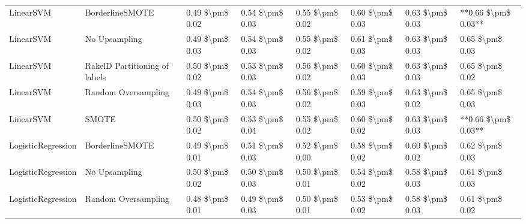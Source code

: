 \begin{tabular}{llllllll}
                      LinearSVM &               BorderlineSMOTE & 0.49 \$\textbackslash pm\$ 0.02 &           0.54 \$\textbackslash pm\$ 0.03 &       0.55 \$\textbackslash pm\$ 0.02 &        0.60 \$\textbackslash pm\$ 0.03 &                         0.63 \$\textbackslash pm\$ 0.03 & **0.66 \$\textbackslash pm\$ 0.03** \\
                      LinearSVM &                 No Upsampling & 0.49 \$\textbackslash pm\$ 0.03 &           0.54 \$\textbackslash pm\$ 0.03 &       0.55 \$\textbackslash pm\$ 0.02 &        0.61 \$\textbackslash pm\$ 0.03 &                         0.63 \$\textbackslash pm\$ 0.03 &     0.65 \$\textbackslash pm\$ 0.03 \\
                      LinearSVM & RakelD Partitioning of labels & 0.50 \$\textbackslash pm\$ 0.02 &           0.53 \$\textbackslash pm\$ 0.03 &       0.56 \$\textbackslash pm\$ 0.02 &        0.60 \$\textbackslash pm\$ 0.03 &                         0.63 \$\textbackslash pm\$ 0.03 &     0.65 \$\textbackslash pm\$ 0.02 \\
                      LinearSVM &           Random Oversampling & 0.49 \$\textbackslash pm\$ 0.03 &           0.54 \$\textbackslash pm\$ 0.03 &       0.56 \$\textbackslash pm\$ 0.02 &        0.59 \$\textbackslash pm\$ 0.03 &                         0.63 \$\textbackslash pm\$ 0.02 &     0.65 \$\textbackslash pm\$ 0.03 \\
                      LinearSVM &                         SMOTE & 0.50 \$\textbackslash pm\$ 0.02 &           0.53 \$\textbackslash pm\$ 0.04 &       0.55 \$\textbackslash pm\$ 0.02 &        0.60 \$\textbackslash pm\$ 0.02 &                         0.63 \$\textbackslash pm\$ 0.03 & **0.66 \$\textbackslash pm\$ 0.03** \\
             LogisticRegression &               BorderlineSMOTE & 0.49 \$\textbackslash pm\$ 0.01 &           0.51 \$\textbackslash pm\$ 0.03 &       0.52 \$\textbackslash pm\$ 0.00 &        0.58 \$\textbackslash pm\$ 0.02 &                         0.60 \$\textbackslash pm\$ 0.02 &     0.62 \$\textbackslash pm\$ 0.03 \\
             LogisticRegression &                 No Upsampling & 0.50 \$\textbackslash pm\$ 0.02 &           0.50 \$\textbackslash pm\$ 0.03 &       0.50 \$\textbackslash pm\$ 0.01 &        0.54 \$\textbackslash pm\$ 0.02 &                         0.58 \$\textbackslash pm\$ 0.03 &     0.61 \$\textbackslash pm\$ 0.03 \\
             LogisticRegression &           Random Oversampling & 0.48 \$\textbackslash pm\$ 0.01 &           0.49 \$\textbackslash pm\$ 0.03 &       0.50 \$\textbackslash pm\$ 0.01 &        0.53 \$\textbackslash pm\$ 0.02 &                         0.58 \$\textbackslash pm\$ 0.03 &     0.61 \$\textbackslash pm\$ 0.02 \\

\end{tabular}
